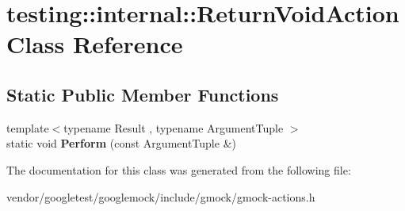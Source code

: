 \hypertarget{classtesting_1_1internal_1_1_return_void_action}{}\section{testing\+:\+:internal\+:\+:Return\+Void\+Action Class Reference}
\label{classtesting_1_1internal_1_1_return_void_action}
\subsection*{Static Public Member Functions}
\begin{DoxyCompactItemize}
\item 
\mbox{\label{classtesting_1_1internal_1_1_return_void_action_ab9ea50ff501225b7510a623d0f0a405e}} 
{\footnotesize template$<$typename Result , typename Argument\+Tuple $>$ }\\static void {\bfseries Perform} (const Argument\+Tuple \&)
\end{DoxyCompactItemize}


The documentation for this class was generated from the following file\+:\begin{DoxyCompactItemize}
\item 
vendor/googletest/googlemock/include/gmock/gmock-\/actions.\+h\end{DoxyCompactItemize}
